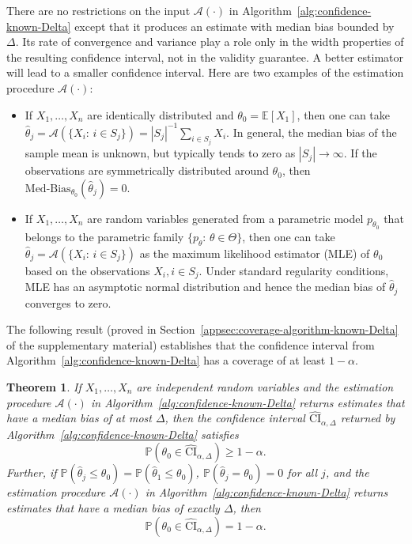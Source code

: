 \documentclass{article}
\newtheorem{thm}{Theorem}
\numberwithin{myalgctr}{section}
\DeclareMathOperator*{\argmax}{arg\,max}
\begin{document}
There are no restrictions on the input $\mathcal{A}(\cdot)$ in Algorithm~\ref{alg:confidence-known-Delta} except that it produces an estimate with median bias bounded by $\Delta$. Its rate of convergence and variance play a role only in the width properties of the resulting confidence interval, not in the validity guarantee. A better estimator will lead to a smaller confidence interval. Here are two examples of the estimation procedure $\mathcal{A}(\cdot)$:
\begin{itemize}[leftmargin=0.2in]
	\item If $X_1, \ldots, X_n$ are identically distributed and $\theta_0 = \mathbb{E}[X_1]$, then one can take
	$\widehat{\theta}_j = \mathcal{A}(\{X_i:\,i\in S_j\}) = {|S_j|^{-1}}\sum_{i\in S_j}X_i.$
	In general, the median bias of the sample mean is unknown, but typically tends to zero as $|S_j|\to\infty$.
	If the observations are symmetrically distributed around $\theta_0$, then $\mbox{Med-Bias}_{\theta_0}(\widehat{\theta}_j) = 0.$
	\item If $X_1, \ldots, X_n$ are random variables generated from a parametric model $p_{\theta_0}$ that belongs to the parametric family $\{p_{\theta}:\,\theta\in\Theta\}$, then one can take
	$\widehat{\theta}_j = \mathcal{A}(\{X_i:\,i\in S_j\})$
	as the maximum likelihood estimator (MLE) of $\theta_0$ based on the observations $X_i, i\in S_j$. 
	Under standard regularity conditions, MLE has an asymptotic normal distribution and hence the median bias of $\widehat{\theta}_j$ converges to zero. 
\end{itemize} 
The following result (proved in Section~\ref{appsec:coverage-algorithm-known-Delta} of the supplementary material) establishes that the confidence interval from Algorithm~\ref{alg:confidence-known-Delta} has a coverage of at least $1 - \alpha$.
\begin{thm}\label{thm:coverage-algorithm-known-Delta}
If $X_1, \ldots, X_n$ are independent random variables and the estimation procedure $\mathcal{A}(\cdot)$ in Algorithm~\ref{alg:confidence-known-Delta} returns estimates that have a median bias of at most $\Delta$, then the confidence interval $\widehat{\mathrm{CI}}_{\alpha,\Delta}$ returned by Algorithm~\ref{alg:confidence-known-Delta} satisfies
\begin{equation}\label{eq:over-coverage-in-general}
\mathbb{P}\left(\theta_0 \in \widehat{\mathrm{CI}}_{\alpha,\Delta}\right) \ge 1 - \alpha.
\end{equation}
Further, if $\mathbb{P}(\widehat{\theta}_j \le \theta_0) = \mathbb{P}(\widehat{\theta}_1 \le \theta_0)$, $\mathbb{P}(\widehat{\theta}_j = \theta_0) = 0$ for all $j$, and the estimation procedure $\mathcal{A}(\cdot)$ in Algorithm~\ref{alg:confidence-known-Delta} returns estimates that have a median bias of exactly $\Delta$, then
\begin{equation}\label{eq:exact-coverage-same-median-bias}
\mathbb{P}\left(\theta_0 \in \widehat{\mathrm{CI}}_{\alpha,\Delta}\right) = 1 - \alpha.
\end{equation}
\end{thm}
\end{document}
